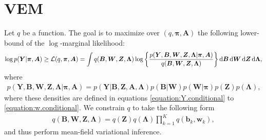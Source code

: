 \documentclass[11pt,authoryear]{article}
\newcommand{\bs}[1]{\boldsymbol{#1}}
\begin{document}
\section{VEM}
Let $q$ be a function. The goal is to maximize over $(q, \bs{\pi},
\bs{A})$ the following lower-bound of the $\log$-marginal likelihood:
\begin{align}
\log p(\bs{Y}|\bs{\pi},\bs{A}) \geq \mathcal{L}(q, \bs{\pi}, \bs{A}) = \int q(\bs{B}, \bs{W}, \bs{Z}, \bs{\Lambda}) \log\left\{\frac{p(\bs{Y},\bs{B},\bs{W},\bs{Z},\bs{\Lambda}|\bs{\pi},\bs{A})}{q(\bs{B}, \bs{W}, \bs{Z}, \bs{\Lambda})}\right\}\dif\bs{B}\dif\bs{W}\dif\bs{Z}\dif\bs{\Lambda},
\end{align}
where
\begin{align}
p(\bs{Y},\bs{B},\bs{W},\bs{Z},\bs{\Lambda}|\bs{\pi},\bs{A}) = p(\bs{Y}|\bs{B}, \bs{Z}, \bs{A}, \bs{\Lambda})p(\bs{B}|\bs{W})p(\bs{W}|\bs{\pi})p(\bs{Z})p(\bs{\Lambda}),
\end{align}
where these densities are defined in equations \eqref{equation:Y.conditional} to \eqref{equation:w.conditional}.
We constrain $q$ to take the following form
\begin{align}
q(\bs{B}, \bs{W}, \bs{Z}, \bs{\Lambda}) = q(\bs{Z})q(\bs{\Lambda})\prod_{k = 1}^{K}q(\bs{b}_k,\bs{w}_k),
\end{align}
and thus perform mean-field variational inference.
\end{document}
